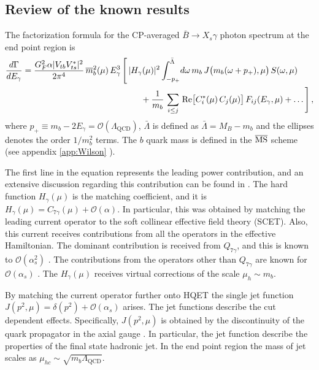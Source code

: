 \subsection{Review of the known results}
The factorization formula for the CP-averaged $\bar{B}\rightarrow X_s\gamma$ photon spectrum at the end point region is  
\begin{equation}\label{eqn:chap3_photon_spectrum}
\begin{aligned}
   \frac{d\Gamma}{dE_\gamma} 
   &= \frac{G_F^2\alpha|V_{tb} V_{ts}^*|^2}{2\pi^4}\,
    \overline{m}_b^2(\mu)\,E_\gamma^3\,\Bigg[\,
    |H_\gamma(\mu)|^2 \int_{-p_+}^{\bar\Lambda}\!d\omega\,m_b\,
    J\big( m_b(\omega+p_+),\mu \big)\,S(\omega,\mu) \\
   &\hspace{4.9cm}\mbox{}+ \frac{1}{m_b}\,\sum_{i\le j}\,
    \mbox{Re}\big[C_i^*(\mu)\,C_j(\mu)\big]\,F_{ij}(E_\gamma,\mu)
    + \dots \Bigg] \,,
\end{aligned}
\end{equation}
where $p_{+} \equiv m_{b}-2 E_{\gamma}=\mathcal{O}\left(\Lambda_{\mathrm{QCD}}\right)$, $\bar{\Lambda}$ is defined as $\bar{\Lambda}=M_{B}-m_{b}$ and the ellipses denotes the order $1/m_{b}^2$ terms. The $b$ quark mass is defined in the $\overline{\rm{MS}}$ scheme (see appendix \ref{app:Wilson} ). \par
The first line in the equation represents the leading power contribution, and an extensive discussion regarding this contribution can be found in \cite{Paz:2009ut, Paz:2006me}. The hard function $H_{\gamma}(\mu)$ is the matching coefficient, and it is $H_{\gamma}(\mu)=C_{7\gamma}(\mu)+\mathcal{O(\alpha)}$. In particular, this was obtained by matching the leading current operator to the soft collinear effective field theory (SCET). Also, this current receives contributions from all the operators in the effective Hamiltonian. The dominant contribution is received from $Q_{7\gamma}$, and this is known to $\mathcal{O}(\alpha_s^2)$ \cite{Melnikov:2005bx}. The contributions from the operators other than $Q_{7\gamma}$ are known for $\mathcal{O}(\alpha_s)$ \cite{Benzke:2010js}. The $H_{\gamma}(\mu)$ receives virtual corrections of the scale $\mu_h\sim m_b$.\par
By matching the current operator further onto HQET the single jet function $J\left(p^{2}, \mu\right)=\delta\left(p^{2}\right)+\mathcal{O}\left(\alpha_{s}\right)$ arises. The jet functions describe the cut dependent effects. Specifically, $J\left(p^{2}, \mu\right)$ is obtained by the discontinuity of the quark propagator in the axial gauge \cite{Becher:2006qw}. In particular, the jet function describe the properties of the final state hadronic jet. In the end point region the mass of jet scales as $\mu_{h c} \sim \sqrt{m_{b} \Lambda_{\mathrm{QCD}}}$.\par
